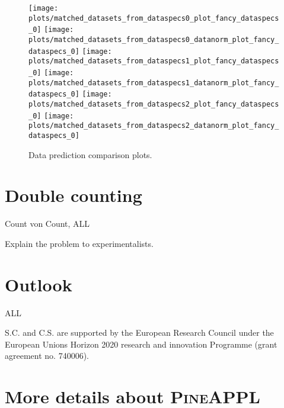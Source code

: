 \documentclass[a4paper,11pt]{article}
\begin{document}
\begin{figure}
    \texttt{[image: plots/matched\_datasets\_from\_dataspecs0\_plot\_fancy\_dataspecs\_0]}
    \texttt{[image: plots/matched\_datasets\_from\_dataspecs0\_datanorm\_plot\_fancy\_dataspecs\_0]}
    \texttt{[image: plots/matched\_datasets\_from\_dataspecs1\_plot\_fancy\_dataspecs\_0]}
    \texttt{[image: plots/matched\_datasets\_from\_dataspecs1\_datanorm\_plot\_fancy\_dataspecs\_0]}
    \texttt{[image: plots/matched\_datasets\_from\_dataspecs2\_plot\_fancy\_dataspecs\_0]}
    \texttt{[image: plots/matched\_datasets\_from\_dataspecs2\_datanorm\_plot\_fancy\_dataspecs\_0]}
    \caption{Data prediction comparison plots.}
    \label{fig:datacomparison}
\end{figure}

\section{Double counting}

Count von Count, ALL

Explain the problem to experimentalists.\\

\section{Outlook}

ALL

\cite{Carli:2010rw}
\cite{Bertone:2014zva}

\appendix

\acknowledgments

S.C. and C.S. are supported by the European Research Council under the European Unions Horizon 2020 research and innovation Programme (grant agreement no. 740006).

\section{More details about \texorpdfstring{\textsc{PineAPPL}}{PineAPPL}}
\label{app:pineappl-interface}





\end{document}
